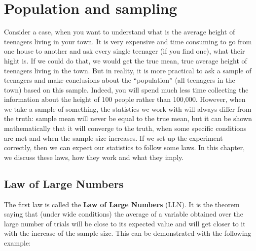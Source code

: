 \documentclass[
]{book}
\theoremstyle{definition}
\theoremstyle{definition}
\theoremstyle{definition}
\theoremstyle{definition}
\theoremstyle{remark}
\begin{document}
\chapter{Population and sampling}\label{PopulationSampling}

Consider a case, when you want to understand what is the average height of teenagers living in your town. It is very expensive and time consuming to go from one house to another and ask every single teenager (if you find one), what their hight is. If we could do that, we would get the true mean, true average height of teenagers living in the town. But in reality, it is more practical to ask a sample of teenagers and make conclusions about the ``population'' (all teenagers in the town) based on this sample. Indeed, you will spend much less time collecting the information about the height of 100 people rather than 100,000. However, when we take a sample of something, the statistics we work with will always differ from the truth: sample mean will never be equal to the true mean, but it can be shown mathematically that it will converge to the truth, when some specific conditions are met and when the sample size increases. If we set up the experiment correctly, then we can expect our statistics to follow some laws. In this chapter, we discuss these laws, how they work and what they imply.

\section{Law of Large Numbers}\label{LLN}

The first law is called the \textbf{Law of Large Numbers} (LLN). It is the theorem saying that (under wide conditions) the average of a variable obtained over the large number of trials will be close to its expected value and will get closer to it with the increase of the sample size. This can be demonstrated with the following example:
\end{document}

